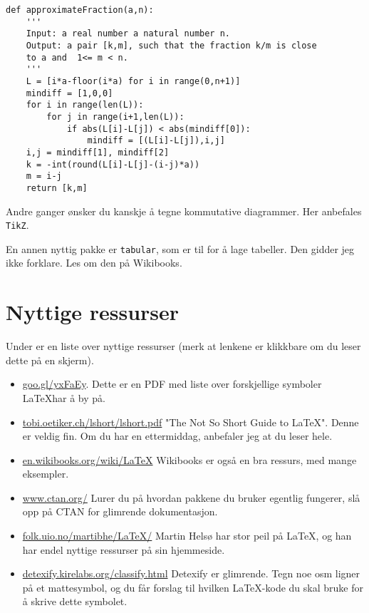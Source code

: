 \documentclass[11pt, a4paper]{article}
\begin{document}
\begin{lstlisting}
def approximateFraction(a,n):
	'''
	Input: a real number a natural number n.
	Output: a pair [k,m], such that the fraction k/m is close 
	to a and  1<= m < n.
	'''
	L = [i*a-floor(i*a) for i in range(0,n+1)]
	mindiff = [1,0,0]
	for i in range(len(L)):
		for j in range(i+1,len(L)):
			if abs(L[i]-L[j]) < abs(mindiff[0]):
				mindiff = [(L[i]-L[j]),i,j]
	i,j = mindiff[1], mindiff[2]
	k = -int(round(L[i]-L[j]-(i-j)*a))
	m = i-j
	return [k,m]
\end{lstlisting}

Andre ganger ønsker du kanskje å tegne kommutative diagrammer. Her anbefales \texttt{TikZ}. 


En annen nyttig pakke er \texttt{tabular}, som er til for å lage tabeller. Den gidder jeg ikke forklare. Les om den på Wikibooks.

\section{Nyttige ressurser}

Under er en liste over nyttige ressurser (merk at lenkene er klikkbare om du leser dette på en skjerm). 

\begin{itemize}
\item \url{goo.gl/yxFaEy}. Dette er en PDF med liste over forskjellige symboler \LaTeX har å by på.
\item \url{tobi.oetiker.ch/lshort/lshort.pdf} "The Not So Short Guide to \LaTeX". Denne er veldig fin. Om du har en ettermiddag, anbefaler jeg at du leser hele.
\item \url{en.wikibooks.org/wiki/LaTeX} Wikibooks er også en bra ressurs, med mange eksempler.
\item \url{www.ctan.org/} Lurer du på hvordan pakkene du bruker egentlig fungerer, slå opp på CTAN for glimrende dokumentasjon.
\item \url{folk.uio.no/martibhe/LaTeX/} Martin Helsø har stor peil på \LaTeX, og han har endel nyttige ressurser på sin hjemmeside. 
\item \url{detexify.kirelabs.org/classify.html}  Detexify er glimrende. Tegn noe osm ligner på et mattesymbol, og du får forslag til hvilken \LaTeX-kode du skal bruke for å skrive dette symbolet. 
\end{itemize}
\end{document}
